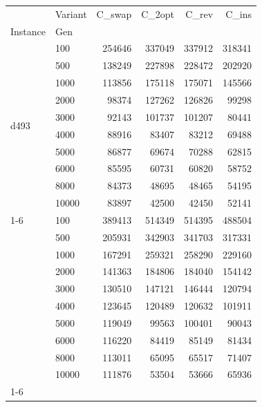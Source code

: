 \begin{tabular}{llrrrr}
\toprule
 & Variant & C\_swap & C\_2opt & C\_rev & C\_ins \\
Instance & Gen &  &  &  &  \\
\midrule
\multirow[t]{10}{*}{d493} & 100 & 254646 & 337049 & 337912 & 318341 \\
 & 500 & 138249 & 227898 & 228472 & 202920 \\
 & 1000 & 113856 & 175118 & 175071 & 145566 \\
 & 2000 & 98374 & 127262 & 126826 & 99298 \\
 & 3000 & 92143 & 101737 & 101207 & 80441 \\
 & 4000 & 88916 & 83407 & 83212 & 69488 \\
 & 5000 & 86877 & 69674 & 70288 & 62815 \\
 & 6000 & 85595 & 60731 & 60820 & 58752 \\
 & 8000 & 84373 & 48695 & 48465 & 54195 \\
 & 10000 & 83897 & 42500 & 42450 & 52141 \\
\cline{1-6}
\multirow[t]{10}{*}{u574} & 100 & 389413 & 514349 & 514395 & 488504 \\
 & 500 & 205931 & 342903 & 341703 & 317331 \\
 & 1000 & 167291 & 259321 & 258290 & 229160 \\
 & 2000 & 141363 & 184806 & 184040 & 154142 \\
 & 3000 & 130510 & 147121 & 146444 & 120794 \\
 & 4000 & 123645 & 120489 & 120632 & 101911 \\
 & 5000 & 119049 & 99563 & 100401 & 90043 \\
 & 6000 & 116220 & 84419 & 85149 & 81434 \\
 & 8000 & 113011 & 65095 & 65517 & 71407 \\
 & 10000 & 111876 & 53504 & 53666 & 65936 \\
\cline{1-6}
\bottomrule
\end{tabular}
